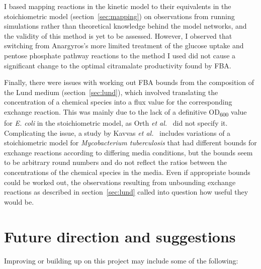 \documentclass[parskip=full, numbers=noenddot]{scrreprt}
\begin{document}
I based mapping reactions in the kinetic model to their equivalents in the stoichiometric model (section~\ref{sec:mapping}) on observations from running simulations rather than theoretical knowledge behind the model networks, and the validity of this method is yet to be assessed. However, I observed that switching from Anargyros's more limited treatment of the glucose uptake and pentose phosphate pathway reactions to the method I used did not cause a significant change to the optimal citramalate productivity found by FBA.

Finally, there were issues with working out FBA bounds from the composition of the Lund medium (section~\ref{sec:lund}), which involved translating the concentration of a chemical species into a flux value for the corresponding exchange reaction. This was mainly due to the lack of a definitive OD\textsubscript{600} value for \emph{E. coli} in the stoichiometric model, as Orth \emph{et al.}~\cite{orth_comprehensive_2011} did not specify it. Complicating the issue, a study by Kavvas \emph{et al.}~\cite{kavvas_updated_2018} includes variations of a stoichiometric model for \emph{Mycobacterium tuberculosis} that had different bounds for exchange reactions according to differing media conditions, but the bounds seem to be arbitrary round numbers and do not reflect the ratios between the concentrations of the chemical species in the media. Even if appropriate bounds could be worked out, the observations resulting from unbounding exchange reactions as described in section~\ref{sec:lund} called into question how useful they would be.

\section{Future direction and suggestions}
\label{sec:future}

Improving or building up on this project may include some of the following:
\end{document}
